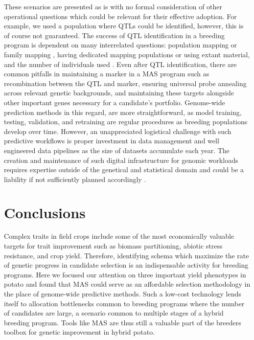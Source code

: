 \begin{refsection}
These scenarios are presented as is with no formal consideration of
other operational questions which could be relevant for their effective
adoption. For example, we used a population where QTLs could be
identified, however, this is of course not guaranteed. The success of
QTL identification in a breeding program is dependent on many
interrelated questions: population mapping or family mapping
\parencite{Wurschum2012}, having dedicated mapping populations or using
extant material, and the number of individuals used
\parencite{Lande1990}. Even after QTL identification, there are common
pitfalls in maintaining a marker in a MAS program such as recombination
between the QTL and marker, ensuring universal probe annealing across
relevant genetic backgrounds, and maintaining these targets alongside
other important genes necessary for a candidate's portfolio. Genome-wide
prediction methods in this regard, are more straightforward, as model
training, testing, validation, and retraining are regular procedures as
breeding populations develop over time. However, an unappreciated
logistical challenge with such predictive workflows is proper investment
in data management and well engineered data pipelines as the size of
datasets accumulate each year. The creation and maintenance of such
digital infrastructure for genomic workloads requires expertise outside
of the genetical and statistical domain and could be a liability if not
sufficiently planned accordingly \parencite{ODriscoll2013,Mulder2017}.

\section{Conclusions} %

Complex traits in field crops include some of the most economically
valuable targets for trait improvement such as biomass partitioning, abiotic
stress resistance, and crop yield. Therefore, identifying schema which
maximize the rate of genetic progress in candidate selection is an
indispensable activity for breeding programs. Here we focused our attention 
on three important yield phenotypes in potato and found that MAS could serve
as an affordable selection methodology in the place of genome-wide predictive
methods. Such a low-cost technology lends itself to allocation bottlenecks common
to breeding programs where the number of candidates are large, a scenario common to 
multiple stages of a hybrid breeding program. Tools like MAS are thus still a valuable part of the
 breeders toolbox for genetic improvement in hybrid potato.

\printbibliography[heading=chapterbib, resetnumbers=true]

\end{refsection}
